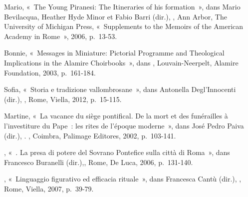 \begin{teiElement}[name={TEI},change={commons\_edition}]
\begin{teiElement}[name={text},type={book},xmlid={book}]
\begin{teiElement}[name={group},type={book},xmlid={book-001}]
\begin{teiElement}[name={group},type={bibliography},data-page-title={Sources et bibliographie},data-include-href={Ch14\_Source\_bibliographie.xml},xmlid={bibliography-001}]
\begin{teiElement}[name={body}]
\begin{teiDiv}[type={section1},xmlid={div18}]
\begin{teiDiv}[type={section2},xmlid={div19}]
\begin{teiBibl}[xmlid={bibl-328}]
 Mario, « The Young Piranesi: The Itineraries of his formation », dans Mario Bevilacqua, Heather Hyde Minor et Fabio Barri (dir.), , Ann Arbor, The University of Michigan Press, « Supplements to the Memoirs of the American Academy in Rome », 2006, p. 13-53.
\end{teiBibl}
              \begin{teiBibl}[xmlid={bibl-329}]
 Bonnie, « Messages in Miniature: Pictorial Programme and Theological Implications in the Alamire Choirbooks », dans , Louvain-Neerpelt, Alamire Foundation, 2003, p. 161-184.
\end{teiBibl}
              \begin{teiBibl}[xmlid={bibl-330}]
 Sofia, « Storia e tradizione vallombrosane », dans Antonella Degl’Innocenti (dir.), , Rome, Viella, 2012, p. 15-115.
\end{teiBibl}
              \begin{teiBibl}[xmlid={bibl-331}]
 Martine, « La vacance du siège pontifical. De la mort et des funérailles à l’investiture du Pape : les rites de l’époque moderne », dans José Pedro Paiva (dir.), . , Coimbra, Palimage Editores, 2002, p. 103-141.
\end{teiBibl}
              \begin{teiBibl}[xmlid={bibl-332}]
, « . La presa di potere del Sovrano Pontefice sulla città di Roma », dans Francesco Buranelli (dir.),, Rome, De Luca, 2006, p. 131-140.
\end{teiBibl}
              \begin{teiBibl}[xmlid={bibl-333}]
, « Linguaggio figurativo ed efficacia rituale », dans Francesca Cantù (dir.), , Rome, Viella, 2007, p. 39-79.
\end{teiBibl}

\end{teiDiv}
\end{teiDiv}
\end{teiElement}
\end{teiElement}
\end{teiElement}
\end{teiElement}
\end{teiElement}
